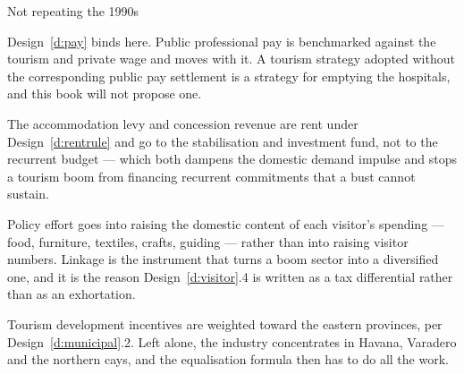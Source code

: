 \begin{design}{Not repeating the 1990s}
\label{d:dutch}
\begin{rules}
 Design~\ref{d:pay} binds here. Public
professional pay is benchmarked against the tourism and private wage and moves
with it. A tourism strategy adopted without the corresponding public pay
settlement is a strategy for emptying the hospitals, and this book will not
propose one.

 The accommodation levy and concession revenue are
rent under Design~\ref{d:rentrule} and go to the stabilisation and investment
fund, not to the recurrent budget --- which both dampens the domestic demand
impulse and stops a tourism boom from financing recurrent commitments that a
bust cannot sustain.

 Policy effort goes into raising the domestic
content of each visitor's spending --- food, furniture, textiles, crafts, guiding
--- rather than into raising visitor numbers. Linkage is the instrument that
turns a boom sector into a diversified one, and it is the reason
Design~\ref{d:visitor}.4 is written as a tax differential rather than as an
exhortation.

 Tourism development incentives are weighted toward
the eastern provinces, per Design~\ref{d:municipal}.2. Left alone, the industry
concentrates in Havana, Varadero and the northern cays, and the equalisation
formula then has to do all the work.
\end{rules}
\end{design}
